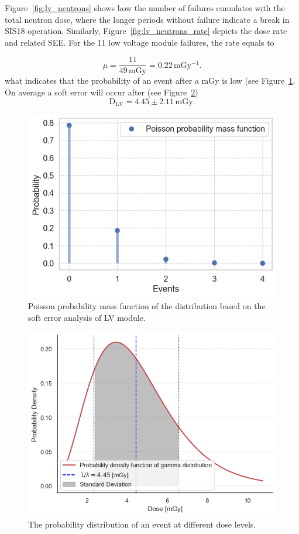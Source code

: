 Figure~\ref{fig:lv_neutrons} shows how the number of failures cumulates with the total neutron dose, where the longer periods without failure indicate a break in SIS18 operation. Similarly, Figure~\ref{fig:lv_neutrons_rate} depicts the dose rate and related \gls{SEE}.
For the 11 low voltage module failures, the rate equals to

   \begin{equation}
  \mu = \frac{11}{49\,\mathrm{mGy}} = 0.22\mathrm{\,mGy^{-1}}.
\end{equation}
what indicates that the probability of an event after a mGy is low (see Figure~\ref{fig:sis18_lv}. On average a soft error will occur after (see Figure~\ref{fig:sis18_lv2})
\begin{equation}
    \mathrm{D}_{\mathrm{LV}}=4.45\pm 2.11\mathrm{\,mGy}.
\end{equation}

\begin{figure}[!h]
    \centering
    \includegraphics[width=0.6\columnwidth]{Chapter4/images/SIS18_LV.png}
    \caption{Poisson probability mass function of the distribution based on the soft error analysis of LV module.}
    \label{fig:sis18_lv}
    
\end{figure}

\begin{figure}[!h]
    \centering
    \includegraphics[width=0.6\columnwidth]{Chapter4/images/SIS18_LV_prob.png}
        \caption{The probability distribution of an event at different dose levels.}
    \label{fig:sis18_lv2}
    
\end{figure}

